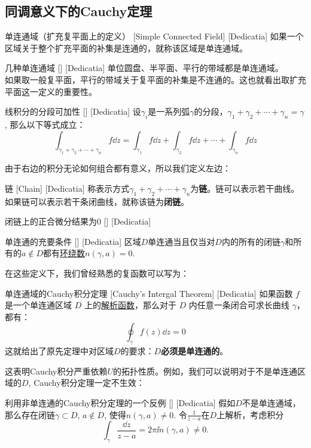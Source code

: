 \documentclass[UTF8]{ctexart}
\newcommand{\AnalyticalFunction}{\hyperref[dfn:AnalyticalFunction]{解析函数}}
\begin{document}
\subsection{同调意义下的Cauchy定理}
\begin{dfn}
    [UUID]
    {单连通域（扩充复平面上的定义）}
    [Simple Connected Field]
    [Dedicatia]
    如果一个区域关于整个扩充平面的补集是连通的，就称该区域是单连通域。
\end{dfn}
\begin{xmp}
    [UUID]
    {几种单连通域}
    []
    [Dedicatia]
    单位圆盘、半平面、平行的带域都是单连通域。\\
    如果取一般复平面，平行的带域关于复平面的补集是不连通的。这也就看出取扩充平面这一定义的重要性。
\end{xmp}
\begin{ppt}
    [UUID]
    {线积分的分段可加性}
    []
    [Dedicatia]
    设$\gamma_i$是一系列弧$\gamma$的分段，$\gamma_1+\gamma_2+\cdots+\gamma_n=\gamma$, 那么以下等式成立：
    \[\int_{\gamma_1+\gamma_2+\cdots+\gamma_n}f\dd{z}=\int_{\gamma_1}f\dd{z}+\int_{\gamma_2}f\dd{z}+\cdots+\int_{\gamma_n}f\dd{z}\]
\end{ppt}
由于右边的积分无论如何组合都有意义，所以我们定义左边：
\begin{dfn}
    [UUID]
    {链}
    [Chain]
    [Dedicatia]
    称表示方式$\gamma_1+\gamma_2+\cdots+\gamma_n$为\textbf{链}。链可以表示若干曲线。如果链可以表示若干条闭曲线，就称该链为\textbf{闭链}。
\end{dfn}
\begin{ppt}
    [UUID]
    {闭链上的正合微分结果为0}
    []
    [Dedicatia]
\end{ppt}
\begin{thm}
    [UUID]
    {单连通的充要条件}
    []
    [Dedicatia]
    区域$D$单连通当且仅当对$D$内的所有的闭链$\gamma$和所有的$a\notin D$都有\hyperref[dfn:WindingNumber]{环绕数}$n(\gamma,a)=0$.
\end{thm}
在这些定义下，我们曾经熟悉的复函数可以写为：
\begin{thm}
    [UUID]
    {单连通域的Cauchy积分定理}
    [Cauchy's Intergal Theorem]
    [Dedicatia]
    如果函数 \( f \) 是一个单连通区域 \( D \) 上的\AnalyticalFunction，那么对于 \( D \) 内任意一条闭合可求长曲线 \( \gamma \)，都有：
    \[\oint_{\gamma} f(z) \dd z = 0\]
    这就给出了原先定理中对区域$D$的要求：\textbf{$D$必须是单连通的}。
\end{thm}
这表明Cauchy积分严重依赖$U$的拓扑性质。例如，我们可以说明对于不是单连通区域的$D$, Cauchy积分定理一定不生效：
\begin{cxmp}
    [UUID]
    {利用非单连通的Cauchy积分定理的一个反例}
    []
    [Dedicatia]
    假如$D$不是单连通域，那么存在闭链$\gamma\subset D$, $a\notin D$, 使得$n(\gamma,a)\neq 0$. 令$\frac{1}{z-a}$在$D$上解析，考虑积分
    \[\int_\gamma\frac{\dd{z}}{z-a}=2\pi\ii n(\gamma,a)\neq 0.\]
\end{cxmp}
\end{document}

